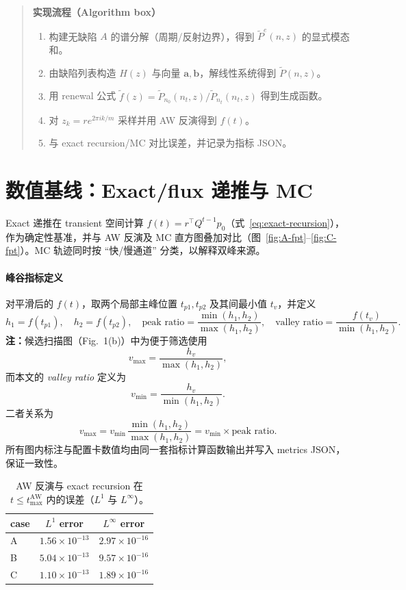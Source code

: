 \documentclass[11pt,fontset=fandol]{ctexart}
\begin{document}
\begin{quote}
\textbf{实现流程（Algorithm box）}
\begin{enumerate}[leftmargin=*, itemsep=0pt]
  \item 构建无缺陷 $A$ 的谱分解（周期/反射边界），得到 $\tilde P^e(n,z)$ 的显式模态和。
  \item 由缺陷列表构造 $H(z)$ 与向量 $\mathbf{a},\mathbf{b}$，解线性系统得到 $\tilde P(n,z)$。
  \item 用 renewal 公式 $\tilde f(z)=\tilde P_{n_0}(n_t,z)/\tilde P_{n_t}(n_t,z)$ 得到生成函数。
  \item 对 $z_k=r e^{2\pi i k/m}$ 采样并用 AW 反演得到 $f(t)$。
  \item 与 exact recursion/MC 对比误差，并记录为指标 JSON。
\end{enumerate}
\end{quote}

\section{数值基线：Exact/flux 递推与 MC}
Exact 递推在 transient 空间计算 $f(t)=r^\top Q^{t-1} p_0$（式~\ref{eq:exact-recursion}），作为确定性基准，并与 AW 反演及 MC 直方图叠加对比（图~\ref{fig:A-fpt}--\ref{fig:C-fpt}）。MC 轨迹同时按 ``快/慢通道'' 分类，以解释双峰来源。

\paragraph{峰谷指标定义}
对平滑后的 $f(t)$，取两个局部主峰位置 $t_{p1},t_{p2}$ 及其间最小值 $t_v$，并定义
\begin{equation}
  h_1=f(t_{p1}),\quad h_2=f(t_{p2}),\quad
  \text{peak ratio}=\frac{\min(h_1,h_2)}{\max(h_1,h_2)},\quad
  \text{valley ratio}=\frac{f(t_v)}{\min(h_1,h_2)}.
\end{equation}
\noindent\textbf{注：}候选扫描图（Fig.~1(b)）中为便于筛选使用
\[
  v_{\max}=\frac{h_v}{\max(h_1,h_2)},
\]
而本文的 \emph{valley ratio} 定义为
\[
  v_{\min}=\frac{h_v}{\min(h_1,h_2)}.
\]
二者关系为
\[
  v_{\max}=v_{\min}\,\frac{\min(h_1,h_2)}{\max(h_1,h_2)}
  =v_{\min}\times \text{peak ratio}.
\]
所有图内标注与配置卡数值均由同一套指标计算函数输出并写入 metrics JSON，保证一致性。

\begin{table}[!htbp]
  \centering
  \begin{tabular}{lcc}
    \toprule
    case & $L^1$ error & $L^\infty$ error \\
    \midrule
    A & $1.56\times 10^{-13}$ & $2.97\times 10^{-16}$ \\
    B & $5.04\times 10^{-13}$ & $9.57\times 10^{-16}$ \\
    C & $1.10\times 10^{-13}$ & $1.89\times 10^{-16}$ \\
    \bottomrule
  \end{tabular}
  \caption{AW 反演与 exact recursion 在 $t\le t_{\max}^{\mathrm{AW}}$ 内的误差（$L^1$ 与 $L^\infty$）。}
  \label{tab:aw-errors}
\end{table}
\end{document}
